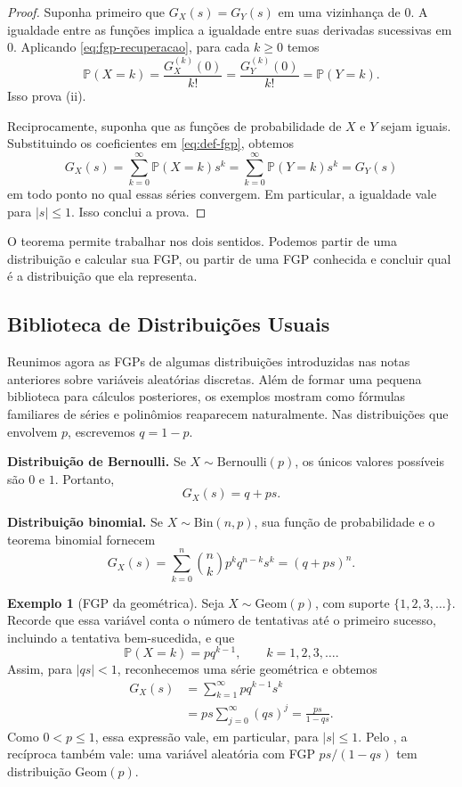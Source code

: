 \documentclass[12pt,portuguese]{article}
\theoremstyle{definition}
\newtheorem{example}[example]{Exemplo}
\theoremstyle{plainexercise}
\theoremstyle{starredexercise}
\theoremstyle{definition}
\begin{document}
\begin{proof}
Suponha primeiro que $G_X(s)=G_Y(s)$ em uma vizinhança de $0$. A igualdade
entre as funções implica a igualdade entre suas derivadas sucessivas em $0$.
Aplicando \eqref{eq:fgp-recuperacao}, para cada $k\geqslant 0$ temos
\[
\mathbb{P}(X=k)
=\frac{G_X^{(k)}(0)}{k!}
=\frac{G_Y^{(k)}(0)}{k!}
=\mathbb{P}(Y=k).
\]
Isso prova (ii).

Reciprocamente, suponha que as funções de probabilidade de $X$ e $Y$ sejam
iguais. Substituindo os coeficientes em \eqref{eq:def-fgp}, obtemos
\[
G_X(s)
=\sum_{k=0}^{\infty}\mathbb{P}(X=k)s^k
=\sum_{k=0}^{\infty}\mathbb{P}(Y=k)s^k
=G_Y(s)
\]
em todo ponto no qual essas séries convergem. Em particular, a igualdade vale
para $|s|\leqslant 1$. Isso conclui a prova.
\end{proof}

O teorema permite trabalhar nos dois sentidos. Podemos partir de uma
distribuição e calcular sua FGP, ou partir de uma FGP conhecida e concluir
qual é a distribuição que ela representa.

\subsection{Biblioteca de Distribuições Usuais}
\label{sec:fgp-distribuicoes-usuais}

Reunimos agora as FGPs de algumas distribuições introduzidas nas notas
anteriores sobre variáveis aleatórias discretas. Além de formar uma pequena
biblioteca para cálculos posteriores, os exemplos mostram como fórmulas
familiares de séries e polinômios reaparecem naturalmente. Nas distribuições
que envolvem $p$, escrevemos $q=1-p$.

\medskip
\noindent\textbf{Distribuição de Bernoulli.}
Se $X\sim\mathrm{Bernoulli}(p)$, os únicos valores possíveis são $0$ e $1$.
Portanto,
\[
G_X(s)=q+ps.
\]

\medskip
\noindent\textbf{Distribuição binomial.}
Se $X\sim\mathrm{Bin}(n,p)$, sua função de probabilidade e o teorema binomial
fornecem
\[
G_X(s)
=\sum_{k=0}^{n}\binom{n}{k}p^kq^{n-k}s^k
=(q+ps)^n.
\]

\begin{example}[FGP da geométrica]\label{ex:fgp-geometrica}
Seja $X\sim\mathrm{Geom}(p)$, com suporte $\{1,2,3,\ldots\}$. Recorde que
essa variável conta o número de tentativas até o primeiro sucesso, incluindo
a tentativa bem-sucedida, e que
\[
\mathbb{P}(X=k)=p q^{k-1},
\qquad k=1,2,3,\ldots.
\]
Assim, para $|qs|<1$, reconhecemos uma série geométrica e obtemos
\[
\begin{aligned}
G_X(s)
&=\sum_{k=1}^{\infty}p q^{k-1}s^k
\\[0.3cm]
&=ps\sum_{j=0}^{\infty}(qs)^j
=\frac{ps}{1-qs}.
\end{aligned}
\]
Como $0<p\leqslant 1$, essa expressão vale, em particular, para
$|s|\leqslant 1$. Pelo , a recíproca também vale:
uma variável aleatória com FGP $ps/(1-qs)$ tem distribuição
$\mathrm{Geom}(p)$.
\end{example}
\end{document}
